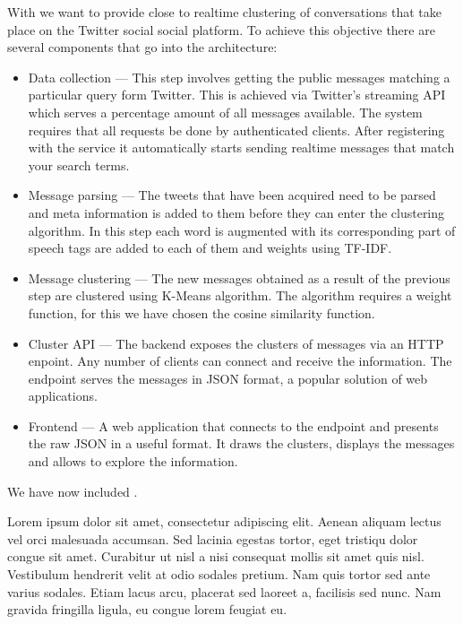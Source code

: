 With \textbf{\project} we want to provide close to realtime 
clustering of conversations that take place on the Twitter social social platform.
\newline
To achieve this objective there are several components that go into the architecture:
\begin{itemize}
	\item Data collection --- This step involves getting the public messages matching a particular query form Twitter. This is achieved via Twitter's streaming API which serves a percentage amount of all messages available. The system requires that all requests be done by authenticated clients. After registering with the service it automatically starts sending realtime messages that match your search terms.
	\item Message parsing --- The tweets that have been acquired need to be parsed and meta information is added to them before they can enter the clustering algorithm. In this step each word is augmented with its corresponding part of speech tags are added to each of them and weights using TF-IDF.
	\item Message clustering --- The new messages obtained as a result of the previous step are clustered using K-Means algorithm. The algorithm requires a weight function, for this we have chosen the cosine similarity function.
	\item Cluster API --- The backend exposes the clusters of messages via an HTTP enpoint. Any number of clients can connect and receive the information. The endpoint serves the messages in JSON format, a popular solution of web applications.
	\item Frontend --- A web application that connects to the endpoint and presents the raw JSON in a useful format. It draws the clusters, displays the messages and allows to explore the information.
\end{itemize}

We have now included .



Lorem ipsum dolor sit amet, consectetur adipiscing elit. Aenean aliquam lectus vel orci malesuada accumsan. Sed lacinia egestas tortor, eget tristiqu dolor congue sit amet. Curabitur ut nisl a nisi consequat mollis sit amet quis nisl. Vestibulum hendrerit velit at odio sodales pretium. Nam quis tortor sed ante varius sodales. Etiam lacus arcu, placerat sed laoreet a, facilisis sed nunc. Nam gravida fringilla ligula, eu congue lorem feugiat eu.

